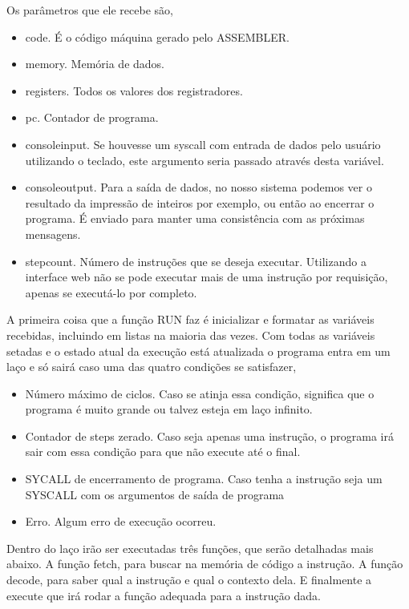 					Os parâmetros que ele recebe são, 
					\begin{itemize} 
						\item code. É o código máquina gerado pelo ASSEMBLER.
						\item memory. Memória de dados.
						\item registers. Todos os valores dos registradores.
						\item pc. Contador de programa.
						\item console\textunderscore input. Se houvesse um syscall com entrada de dados pelo usuário utilizando o teclado, este argumento seria passado através desta variável. 
						\item console\textunderscore  output. Para a saída de dados, no nosso sistema podemos ver o resultado da impressão de inteiros por exemplo, ou então ao encerrar o programa. É enviado para manter uma consistência com as próximas mensagens.
						\item step\textunderscore count. Número de instruções que se deseja executar. Utilizando a interface web não se pode executar mais de uma instrução por requisição, apenas se executá-lo por completo.
					\end{itemize}

					A primeira coisa que a função RUN faz é inicializar e formatar as variáveis recebidas, incluindo em listas na maioria das vezes. Com todas as variáveis setadas e o estado atual da execução está atualizada o programa entra em um laço e só sairá caso uma das quatro condições se satisfazer,

					\begin{itemize} 
						\item Número máximo de ciclos. Caso se atinja essa condição, significa que o programa é muito grande ou talvez esteja em laço infinito.
						\item Contador de steps zerado. Caso seja apenas uma instrução, o programa irá sair com essa condição para que não execute até o final.
						\item SYCALL de encerramento de programa. Caso tenha a instrução seja um SYSCALL com os argumentos de saída de programa
						\item Erro. Algum erro de execução ocorreu.
						
					\end{itemize}

					Dentro do laço irão ser executadas três funções, que serão detalhadas mais abaixo. A função fetch, para buscar na memória de código a instrução. A função decode, para saber qual a instrução e qual o contexto dela. E finalmente a execute que irá rodar a função adequada para a instrução dada.


